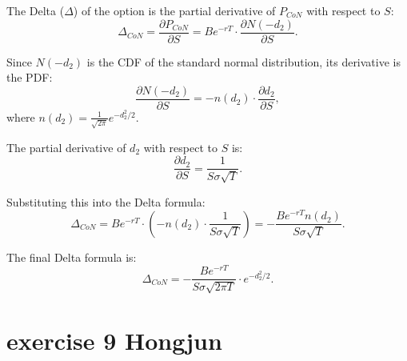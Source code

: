 \documentclass{article}
\begin{document}
The Delta ($\Delta$) of the option is the partial derivative of $P_{CoN}$ with respect to $S$:
\[
\Delta_{CoN} = \frac{\partial P_{CoN}}{\partial S} = B e^{-rT} \cdot \frac{\partial N(-d_2)}{\partial S}.
\]

Since $N(-d_2)$ is the CDF of the standard normal distribution, its derivative is the PDF:
\[
\frac{\partial N(-d_2)}{\partial S} = -n(d_2) \cdot \frac{\partial d_2}{\partial S},
\]
where $n(d_2) = \frac{1}{\sqrt{2\pi}} e^{-d_2^2/2}$.

The partial derivative of $d_2$ with respect to $S$ is:
\[
\frac{\partial d_2}{\partial S} = \frac{1}{S \sigma \sqrt{T}}.
\]

Substituting this into the Delta formula:
\[
\Delta_{CoN} = B e^{-rT} \cdot \left( -n(d_2) \cdot \frac{1}{S \sigma \sqrt{T}} \right) = -\frac{B e^{-rT} n(d_2)}{S \sigma \sqrt{T}}.
\]

The final Delta formula is:
\[
\Delta_{CoN} = -\frac{B e^{-rT}}{S \sigma \sqrt{2\pi T}} \cdot e^{-d_2^2/2}.
\]


\section{exercise 9 Hongjun}
\end{document}
